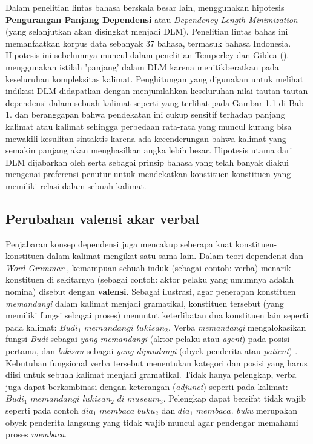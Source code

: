 Dalam penelitian lintas bahasa berskala besar lain, \cite{futrell2015large} menggunakan hipotesis \textbf{Pengurangan Panjang Dependensi} atau \textit{Dependency Length Minimization} (yang selanjutkan akan disingkat menjadi DLM). Penelitian lintas bahas ini memanfaatkan korpus data sebanyak 37 bahasa, termasuk bahasa Indonesia. Hipotesis ini sebelumnya muncul dalam penelitian Temperley dan Gildea (\citealp{temperley2007minimization, temperley2008dependency, gildea2010grammars}). \cite{gildea2010grammars} menggunakan istilah 'panjang' dalam DLM karena menitikberatkan pada keseluruhan kompleksitas kalimat. Penghitungan yang digunakan untuk melihat indikasi DLM didapatkan dengan menjumlahkan keseluruhan nilai tautan-tautan dependensi dalam sebuah kalimat seperti yang terlihat pada Gambar 1.1 di Bab 1. \cite{liu2017dependency} dan \cite{i2004euclidean} beranggapan bahwa pendekatan ini cukup sensitif terhadap panjang kalimat atau kalimat sehingga perbedaan rata-rata yang muncul kurang bisa mewakili kesulitan sintaktis karena ada kecenderungan bahwa kalimat yang semakin panjang akan menghasilkan angka lebih besar. Hipotesis utama dari DLM dijabarkan oleh \cite{gildea2010grammars} serta \cite{futrell2015large} sebagai prinsip bahasa yang telah banyak diakui mengenai preferensi penutur untuk mendekatkan konstituen-konstituen yang memiliki relasi dalam sebuah kalimat.

\subsection{Perubahan valensi akar verbal}
Penjabaran konsep dependensi juga mencakup seberapa kuat konstituen-konstituen dalam kalimat mengikat satu sama lain. Dalam teori dependensi \citep{tesniere1959elements} dan \textit{Word Grammar} \citep{hudson2007language}, kemampuan sebuah induk (sebagai contoh: verba) menarik konstituen di sekitarnya (sebagai contoh: aktor pelaku yang umumnya adalah nomina) disebut dengan \textbf{valensi}. Sebagai ilustrasi, agar penerapan konstituen \textit{memandangi} dalam kalimat menjadi gramatikal, konstituen tersebut (yang memiliki fungsi sebagai proses) menuntut keterlibatan dua konstituen lain seperti pada kalimat: $Budi_1$ $memandangi$ $lukisan_2$. Verba \textit{memandangi} mengalokasikan fungsi \textit{Budi} sebagai \textit{yang memandangi} (aktor pelaku atau \textit{agent}) pada posisi pertama, dan \textit{lukisan} sebagai \textit{yang dipandangi} (obyek penderita atau \textit{patient}) \citep{welke2002deutsche}. Kebutuhan fungsional verba tersebut menentukan kategori dan posisi yang harus diisi untuk sebuah kalimat menjadi gramatikal. Tidak hanya pelengkap, verba juga dapat berkombinasi dengan keterangan (\textit{adjunct}) seperti pada kalimat: $Budi_1$ $memandangi$ $lukisan_2$ $di$ $museum_3$. Pelengkap dapat bersifat tidak wajib seperti pada contoh $dia_1$ $membaca$ $buku_2$ dan $dia_1$ $membaca$. \textit{buku} merupakan obyek penderita langsung yang tidak wajib muncul agar pendengar memahami proses \textit{membaca}. 

